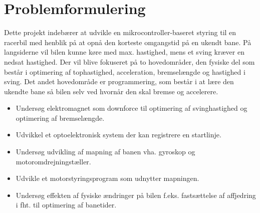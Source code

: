 
\section{Problemformulering}
Dette projekt indebærer at udvikle en mikrocontroller-baseret styring til en racerbil med henblik på at opnå den korteste omgangstid på en ukendt bane. På langsiderne vil bilen kunne køre med max. hastighed, mens et sving kræver en nedsat hastighed. Der vil blive fokuseret på to hovedområder, den fysiske del som består i optimering af tophastighed, acceleration, bremselængde og hastighed i sving. Det andet hovedområde er programmering, som består i at lære den ukendte bane så bilen selv ved hvornår den skal bremse og accelerere.
\begin{itemize}
\item Undersøg elektromagnet som downforce til optimering af svinghastighed og optimering af bremselængde.
\item Udvikkel et optoelektronisk system der kan registrere en startlinje.
\item Undersøg udvikling af mapning af banen vha. gyroskop og motoromdrejningstæller.
\item Udvikle et motorstyringsprogram som udnytter mapningen.
\item Undersøg effekten af fysiske ændringer på bilen f.eks. fastsættelse af affjedring i fht. til optimering af banetider.
\end{itemize}
